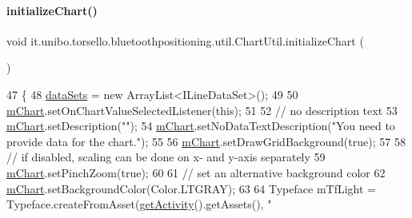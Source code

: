 \paragraph{\texorpdfstring{initialize\+Chart()}{initializeChart()}}
{\footnotesize\ttfamily void it.\+unibo.\+torsello.\+bluetoothpositioning.\+util.\+Chart\+Util.\+initialize\+Chart (\begin{DoxyParamCaption}{ }\end{DoxyParamCaption})\hspace{0.3cm}{\ttfamily [private]}}


\begin{DoxyCode}
47                                    \{
48         \hyperlink{classit_1_1unibo_1_1torsello_1_1bluetoothpositioning_1_1util_1_1ChartUtil_aa98bcaa2d5ba444b91cdc029768d380a_aa98bcaa2d5ba444b91cdc029768d380a}{dataSets} = \textcolor{keyword}{new} ArrayList<ILineDataSet>();
49 
50         \hyperlink{classit_1_1unibo_1_1torsello_1_1bluetoothpositioning_1_1util_1_1ChartUtil_a60b5bd6796cc5dcde12d9a6bb3e67c86_a60b5bd6796cc5dcde12d9a6bb3e67c86}{mChart}.setOnChartValueSelectedListener(\textcolor{keyword}{this});
51 
52         \textcolor{comment}{// no description text}
53         \hyperlink{classit_1_1unibo_1_1torsello_1_1bluetoothpositioning_1_1util_1_1ChartUtil_a60b5bd6796cc5dcde12d9a6bb3e67c86_a60b5bd6796cc5dcde12d9a6bb3e67c86}{mChart}.setDescription(\textcolor{stringliteral}{""});
54         \hyperlink{classit_1_1unibo_1_1torsello_1_1bluetoothpositioning_1_1util_1_1ChartUtil_a60b5bd6796cc5dcde12d9a6bb3e67c86_a60b5bd6796cc5dcde12d9a6bb3e67c86}{mChart}.setNoDataTextDescription(\textcolor{stringliteral}{"You need to provide data for the chart."});
55 
56         \hyperlink{classit_1_1unibo_1_1torsello_1_1bluetoothpositioning_1_1util_1_1ChartUtil_a60b5bd6796cc5dcde12d9a6bb3e67c86_a60b5bd6796cc5dcde12d9a6bb3e67c86}{mChart}.setDrawGridBackground(\textcolor{keyword}{true});
57 
58         \textcolor{comment}{// if disabled, scaling can be done on x- and y-axis separately}
59         \hyperlink{classit_1_1unibo_1_1torsello_1_1bluetoothpositioning_1_1util_1_1ChartUtil_a60b5bd6796cc5dcde12d9a6bb3e67c86_a60b5bd6796cc5dcde12d9a6bb3e67c86}{mChart}.setPinchZoom(\textcolor{keyword}{true});
60 
61         \textcolor{comment}{// set an alternative background color}
62         \hyperlink{classit_1_1unibo_1_1torsello_1_1bluetoothpositioning_1_1util_1_1ChartUtil_a60b5bd6796cc5dcde12d9a6bb3e67c86_a60b5bd6796cc5dcde12d9a6bb3e67c86}{mChart}.setBackgroundColor(Color.LTGRAY);
63 
64         Typeface mTfLight = Typeface.createFromAsset(\hyperlink{classit_1_1unibo_1_1torsello_1_1bluetoothpositioning_1_1util_1_1ChartUtil_a59150a6d20b6d0ad2fcf8c1ba858d355_a59150a6d20b6d0ad2fcf8c1ba858d355}{getActivity}().getAssets(), \textcolor{stringliteral}{"
}
\end{DoxyCode}
